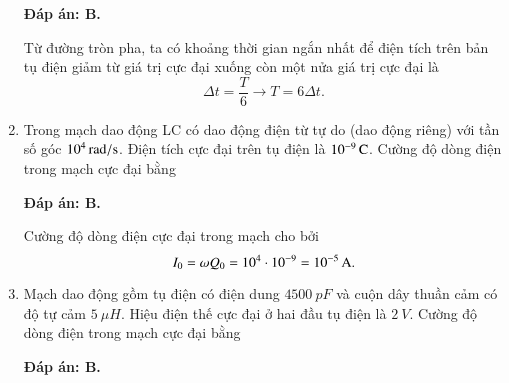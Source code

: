 \begin{enumerate}[label=\bfseries Câu \arabic*:]
	\hideall
	{		\textbf{Đáp án: B.}
		
		Từ đường tròn pha, ta có khoảng thời gian ngắn nhất để điện tích trên bản tụ điện giảm từ giá trị cực đại xuống còn một nửa giá trị cực đại là
		$$
		\Delta t=\dfrac{T}{6} \rightarrow T=6 \Delta t.
		$$
		
	}
	
	\item {}
	
	{Trong mạch dao động LC có dao động điện từ tự do (dao động riêng) với tần số góc $\xsi{10^{4}}{rad/s}$. Điện tích cực đại trên tụ điện là $\xsi{10^{-9}}{C}$. Cường độ dòng điện trong mạch cực đại bằng
	}
	
	\hideall
	{		\textbf{Đáp án: B.}
		
		Cường độ dòng điện cực đại trong mạch cho bởi
		$$
		I_{0}=\omega Q_{0}=10^{4} \cdot 10^{-9}= \xsi{10^{-5}}{A}.
		$$
		
	}
	
	\item {}
	
	{Mạch dao động gồm tụ điện có điện dung $\SI{4500}{pF}$ và cuộn dây thuần cảm có độ tự cảm $\SI{5}{\mu H}$. Hiệu điện thế cực đại ở hai đầu tụ điện là $\SI{2}{V}$. Cường độ dòng điện trong mạch cực đại bằng
	}
	
	\hideall
	{		\textbf{Đáp án: B.}
		
}
\end{enumerate}
